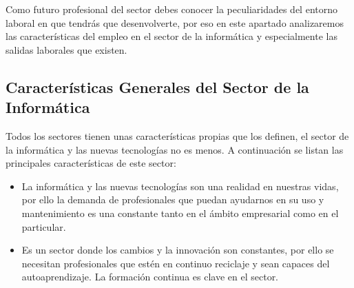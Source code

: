 Como futuro profesional del sector debes conocer la peculiaridades del entorno laboral en que tendrás que desenvolverte, por eso en este apartado analizaremos las características del empleo en el sector de la informática y especialmente las salidas laborales que existen.

\subsection{Características Generales del Sector de la Informática}
Todos los sectores tienen unas características propias que los definen, el sector de la informática y las nuevas tecnologías no es menos. A continuación se listan las principales características de este sector:

\begin{itemize}
    \item La informática y las nuevas tecnologías son una realidad en nuestras vidas, por ello la demanda de profesionales que puedan ayudarnos en su uso y mantenimiento es una constante tanto en el ámbito empresarial como en el particular.
    \item Es un sector donde los cambios y la innovación son constantes, por ello se necesitan profesionales que estén en continuo reciclaje y sean capaces del autoaprendizaje. La formación continua es clave en el sector.
\end{itemize}









\glsaddall
\printglossaries


\newpage
{}



